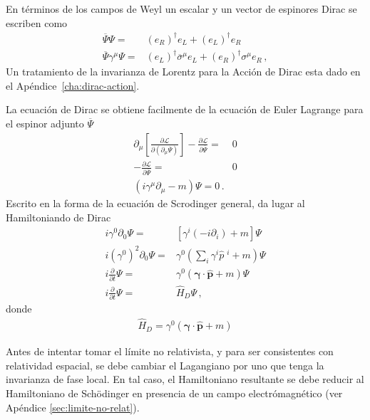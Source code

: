 En términos de los campos de Weyl un escalar y un vector de espinores Dirac se escriben como
\begin{align}
\label{eq:mwd}
  \overline{\Psi}\Psi =& \left( e_R \right)^\dagger e_L+\left( e_L \right)^{\dagger}e_R \nonumber\\
  \overline{\Psi}\gamma^{\mu}\Psi=& (e_L)^{\dagger}\overline{\sigma}^{\mu}e_L+(e_R)^{\dagger}\sigma^{\mu}e_{R}\,,
\end{align}
Un tratamiento de la invarianza de Lorentz para la Acción de Dirac esta dado en el Apéndice~\ref{cha:dirac-action}. 

\begin{frame}
La ecuación de Dirac se obtiene facilmente de la ecuación de Euler Lagrange para el espinor adjunto $\overline{\Psi}$
\begin{align}
  \partial_{\mu}\left[ \frac{\partial\mathcal{L}}{\partial \left( \partial_{\mu} \overline{\Psi} \right)} \right]-\frac{\partial \mathcal{L}}{\partial \overline{\Psi}}=&0 \nonumber\\
-\frac{\partial \mathcal{L}}{\partial \overline{\Psi}}=&0 \nonumber\\
\left( i\gamma^{\mu}\partial_{\mu}-m \right)\Psi=0\,.
\end{align}
Escrito en la forma de la ecuación de Scrodinger general, da lugar al Hamiltoniando de Dirac
\begin{align}
  i\gamma^0 \partial_{0}\Psi=&\left[ \gamma^{i} \left( -i \partial_{i}\right)+m \right]\Psi \nonumber\\
  i \left( \gamma^0 \right)^2 \partial_{0}\Psi=&\gamma^0\left( \sum_i\gamma^{i} \widehat{p}\;^i +m \right)\Psi \nonumber\\
  i \frac{\partial}{\partial t}\Psi=&\gamma^0\left( \boldsymbol{\gamma}\cdot \widehat{\boldsymbol{p}} +m \right)\Psi \nonumber\\
  i \frac{\partial}{\partial t}\Psi=&\widehat{H}_D\Psi\,,
\end{align}
donde
\begin{align}
  \widehat{H}_D=\gamma^0\left( \boldsymbol{\gamma}\cdot \widehat{\boldsymbol{p}} +m \right)
\end{align}
\end{frame}
Antes de intentar tomar el límite no relativista, y para ser consistentes con relatividad espacial, se debe cambiar el Lagangiano por uno que tenga la invarianza de fase local. En tal caso, el Hamiltoniano resultante se debe reducir al Hamiltoniano de  Sch\"odinger en presencia de un campo electrómagnético (ver Apéndice \ref{sec:limite-no-relat}).


